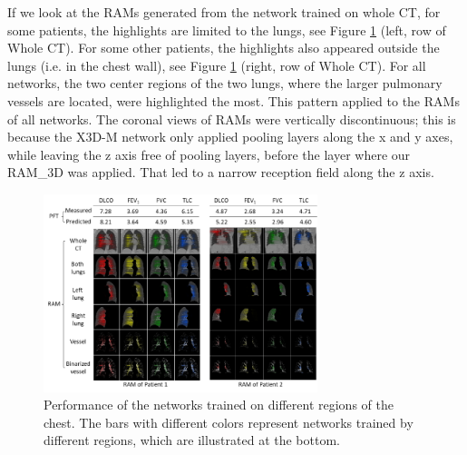 If we look at the RAMs generated from the network trained on whole CT, for some patients, the highlights are limited to the lungs, see Figure \ref{fig:chap4_ram} (left, row of Whole CT). For some other patients, the highlights also appeared outside the lungs (i.e. in the chest wall), see Figure \ref{fig:chap4_ram} (right, row of Whole CT). For all networks, the two center regions of the two lungs, where the larger pulmonary vessels are located, were highlighted the most. This pattern applied to the RAMs of all networks. The coronal views of RAMs were vertically  discontinuous; this is because the X3D-M network only applied pooling layers along the x and y axes, while leaving the z axis free of pooling layers, before the layer where our RAM\_3D was applied. That led to a narrow reception field along the z axis. 


\begin{figure}[tb]
    \centering
    \includegraphics[width=8cm]{ram.png}
    \caption{Performance of the networks trained on different regions of the chest. The bars with different colors represent networks trained by different regions, which are illustrated at the bottom.}
    \label{fig:chap4_ram}
\end{figure}


